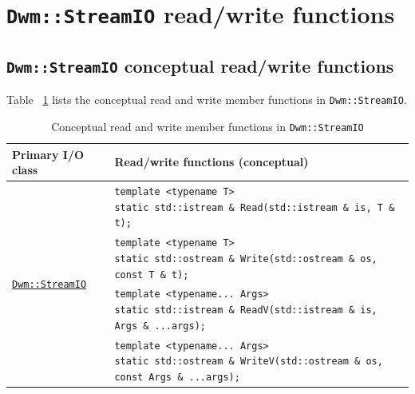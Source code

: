 \section{\texttt{Dwm::StreamIO} read/write functions}
\subsection{\texttt{Dwm::StreamIO} conceptual read/write functions}
Table ~\ref{table:StreamIOConceptualReadWriteFuncs} lists the conceptual
read and write member functions in \texttt{Dwm::StreamIO}.
\begin{table}[H]
\begin{tabular}{ll}
  \textbf{Primary I/O class} & \textbf{Read/write functions (conceptual)} \\ \hline
  \multirow{4}{*}{\hyperref[section:DwmStreamIOClass]{\texttt{Dwm::StreamIO}}} & \makecell[l]{\texttt{template <typename T>}\\ \texttt{static std::istream \& Read(std::istream \& is, T \& t);}} \\ \cline{2-2}
  & \makecell[l]{\texttt{template <typename T>}\\ \texttt{static std::ostream \& Write(std::ostream \& os, const T \& t);}} \\ \cline{2-2}
  & \makecell[l]{\texttt{template <typename... Args>}\\ \texttt{static std::istream \& ReadV(std::istream \& is, Args \& ...args);}} \\ \cline{2-2}
  & \makecell[l]{\texttt{template <typename... Args>}\\ \texttt{static std::ostream \& WriteV(std::ostream \& os, const Args \& ...args);}} \\ \hline
\end{tabular}
\caption{Conceptual read and write member functions in \texttt{Dwm::StreamIO}}
\label{table:StreamIOConceptualReadWriteFuncs}
\end{table}

